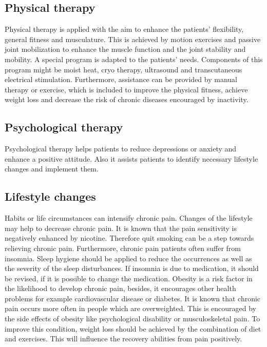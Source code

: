 \subsection{Physical therapy}
Physical therapy is applied with the aim to enhance the patients' flexibility, general fitness and musculature. This is achieved by motion exercises and passive joint mobilization to enhance the muscle function and the joint stability and mobility. A special program is adapted to the patients' needs. Components of this program might be moist heat, cryo therapy, ultrasound and transcutaneous electrical stimulation. Furthermore, assistance can be provided by manual therapy or exercise, which is included to improve the physical fitness, achieve weight loss and decrease the risk of chronic diseases encouraged by inactivity. \cite{marcus2009,pope2017}

\subsection{Psychological therapy}
Psychological therapy helps patients to reduce depressions or anxiety and enhance a positive attitude. Also it assists patients to identify necessary lifestyle changes and implement them. \cite{marcus2009,pope2017} 

\subsection{Lifestyle changes}
Habits or life circumstances can intensify chronic pain. Changes of the lifestyle may help to decrease chronic pain. It is known that the pain sensitivity is negatively enhanced by nicotine. Therefore quit smoking can be a step towards relieving chronic pain.
Furthermore, chronic pain patients often suffer from insomnia. Sleep hygiene should be applied to reduce the occurrences as well as the severity of the sleep disturbances. If insomnia is due to medication, it should be revised, if it is possible to change the medication.
Obesity is a risk factor in the likelihood to  develop chronic pain, besides, it encourages other health problems for example cardiovascular disease or diabetes. It is known that chronic pain occurs more often in people which are overweighted. This is encouraged by the side effects of obesity like psychological disability or musculoskeletal pain. To improve this condition, weight loss should be achieved by the combination of diet and exercises. This will influence the recovery abilities from pain positively. \cite{marcus2009,pope2017}

